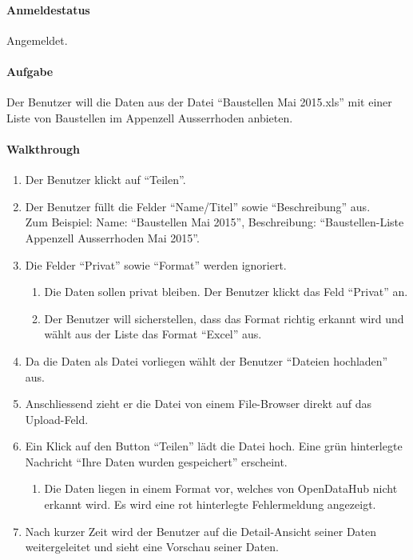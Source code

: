 \paragraph{Anmeldestatus} Angemeldet.

\paragraph{Aufgabe} Der Benutzer will die Daten aus der Datei ``Baustellen Mai 2015.xls'' mit einer Liste von Baustellen im Appenzell Ausserrhoden anbieten.

\paragraph{Walkthrough}
\begin{enumerate}
\item Der Benutzer klickt auf ``Teilen''.
\item Der Benutzer füllt die Felder ``Name/Titel'' sowie ``Beschreibung'' aus. \\
      Zum Beispiel: Name: ``Baustellen Mai 2015'', Beschreibung: ``Baustellen-Liste Appenzell Ausserrhoden Mai 2015''.
\item Die Felder ``Privat'' sowie ``Format'' werden ignoriert.
  \begin{enumerate}[label=\labelenumi\alph*.]
  \item Die Daten sollen privat bleiben. Der Benutzer klickt das Feld ``Privat'' an.
  \item Der Benutzer will sicherstellen, dass das Format richtig erkannt wird und wählt aus der Liste das Format ``Excel'' aus.
  \end{enumerate}
\item Da die Daten als Datei vorliegen wählt der Benutzer ``Dateien hochladen'' aus.
\item Anschliessend zieht er die Datei von einem File-Browser direkt auf das Upload-Feld.
\item Ein Klick auf den Button ``Teilen'' lädt die Datei hoch. Eine grün hinterlegte Nachricht ``Ihre Daten wurden gespeichert'' erscheint.  
  \begin{enumerate}[label=\labelenumi\alph*.]
  \item Die Daten liegen in einem Format vor, welches von OpenDataHub nicht erkannt wird. Es wird eine rot hinterlegte Fehlermeldung angezeigt.
  \end{enumerate}
\item Nach kurzer Zeit wird der Benutzer auf die Detail-Ansicht seiner Daten weitergeleitet und sieht eine Vorschau seiner Daten.
\end{enumerate}

